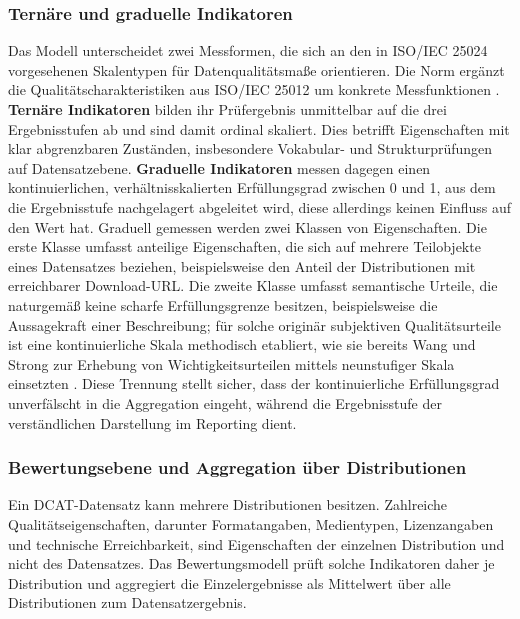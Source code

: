 \subsubsection{Ternäre und graduelle Indikatoren}

Das Modell unterscheidet zwei Messformen, die sich an den in ISO/IEC 25024 vorgesehenen Skalentypen für Datenqualitätsmaße orientieren. Die Norm ergänzt die Qualitätscharakteristiken aus ISO/IEC 25012 um konkrete Messfunktionen \cite{iso25024, iso25012}. \textbf{Ternäre Indikatoren} bilden ihr Prüfergebnis unmittelbar auf die drei Ergebnisstufen ab und sind damit ordinal skaliert. Dies betrifft Eigenschaften mit klar abgrenzbaren Zuständen, insbesondere Vokabular- und Strukturprüfungen auf Datensatzebene. \textbf{Graduelle Indikatoren} messen dagegen einen kontinuierlichen, verhältnisskalierten Erfüllungsgrad zwischen 0 und 1, aus dem die Ergebnisstufe nachgelagert abgeleitet wird, diese allerdings keinen Einfluss auf den Wert hat. Graduell gemessen werden zwei Klassen von Eigenschaften. Die erste Klasse umfasst anteilige Eigenschaften, die sich auf mehrere Teilobjekte eines Datensatzes beziehen, beispielsweise den Anteil der Distributionen mit erreichbarer Download-URL. Die zweite Klasse umfasst semantische Urteile, die naturgemäß keine scharfe Erfüllungsgrenze besitzen, beispielsweise die Aussagekraft einer Beschreibung; für solche originär subjektiven Qualitätsurteile ist eine kontinuierliche Skala methodisch etabliert, wie sie bereits Wang und Strong zur Erhebung von Wichtigkeitsurteilen mittels neunstufiger Skala einsetzten \cite{wang1996beyond}. Diese Trennung stellt sicher, dass der kontinuierliche Erfüllungsgrad unverfälscht in die Aggregation eingeht, während die Ergebnisstufe der verständlichen Darstellung im Reporting dient.

\subsubsection{Bewertungsebene und Aggregation über Distributionen}

Ein DCAT-Datensatz kann mehrere Distributionen besitzen. Zahlreiche Qualitätseigenschaften, darunter Formatangaben, Medientypen, Lizenzangaben und technische Erreichbarkeit, sind Eigenschaften der einzelnen Distribution und nicht des Datensatzes. Das Bewertungsmodell prüft solche Indikatoren daher je Distribution und aggregiert die Einzelergebnisse als Mittelwert über alle Distributionen zum Datensatzergebnis.

